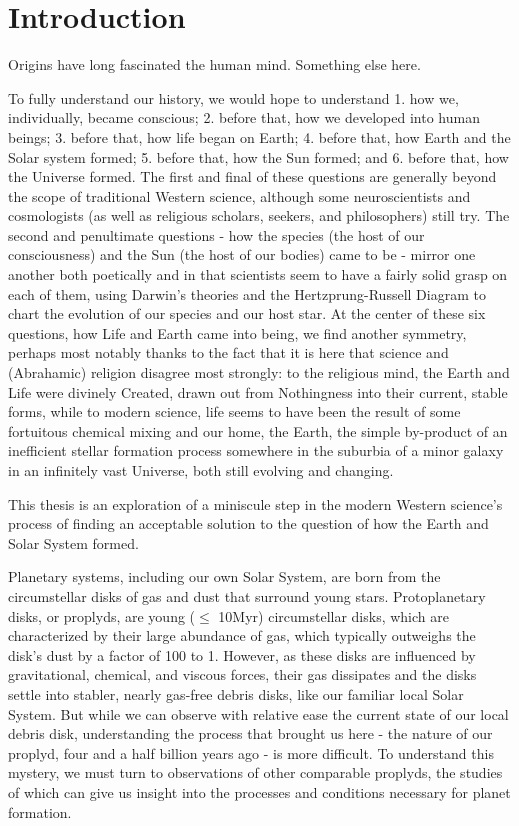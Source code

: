 \chapter{Introduction}

Origins have long fascinated the human mind. Something else here.

To fully understand our history, we would hope to understand 1. how we, individually, became conscious; 2. before that, how we developed into human beings; 3. before that, how life began on Earth; 4. before that, how Earth and the Solar system formed; 5. before that, how the Sun formed; and 6. before that, how the Universe formed. The first and final of these questions are generally beyond the scope of traditional Western science, although some neuroscientists and cosmologists (as well as religious scholars, seekers, and philosophers) still try. The second and penultimate questions - how the species (the host of our consciousness) and the Sun (the host of our bodies) came to be - mirror one another both poetically and in that scientists seem to have a fairly solid grasp on each of them, using Darwin's theories and the Hertzprung-Russell Diagram to chart the evolution of our species and our host star. At the center of these six questions, how Life and Earth came into being, we find another symmetry, perhaps most notably thanks to the fact that it is here that science and (Abrahamic) religion disagree most strongly: to the religious mind, the Earth and Life were divinely Created, drawn out from Nothingness into their current, stable forms, while to modern science, life seems to have been the result of some fortuitous chemical mixing and our home, the Earth, the simple by-product of an inefficient stellar formation process somewhere in the suburbia of a minor galaxy in an infinitely vast Universe, both still evolving and changing.


This thesis is an exploration of a miniscule step in the modern Western science's process of finding an acceptable solution to the question of how the Earth and Solar System formed.

Planetary systems, including our own Solar System, are born from the circumstellar disks of gas and dust that surround young stars. Protoplanetary disks, or proplyds, are young ($\leq$ 10Myr) circumstellar disks, which are characterized by their large abundance of gas, which typically outweighs the disk's dust by a factor of 100 to 1. However, as these disks are influenced by gravitational, chemical, and viscous forces, their gas dissipates and the disks settle into stabler, nearly gas-free debris disks, like our familiar local Solar System. But while we can observe with relative ease the current state of our local debris disk, understanding the process that brought us here - the nature of our proplyd, four and a half billion years ago - is more difficult. To understand this mystery, we must turn to observations of other comparable proplyds, the studies of which can give us insight into the processes and conditions necessary for planet formation.

